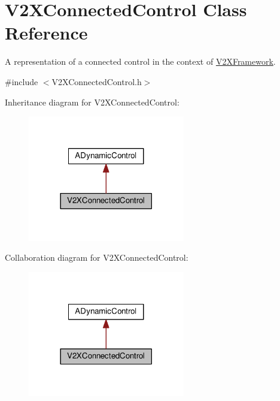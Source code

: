 \hypertarget{classV2XConnectedControl}{}\section{V2\+X\+Connected\+Control Class Reference}
\label{classV2XConnectedControl}


A representation of a connected control in the context of \hyperlink{classV2XFramework}{V2\+X\+Framework}.  




{\ttfamily \#include $<$V2\+X\+Connected\+Control.\+h$>$}



Inheritance diagram for V2\+X\+Connected\+Control\+:\nopagebreak
\begin{figure}[H]
\begin{center}
\leavevmode
\includegraphics[width=194pt]{classV2XConnectedControl__inherit__graph}
\end{center}
\end{figure}


Collaboration diagram for V2\+X\+Connected\+Control\+:\nopagebreak
\begin{figure}[H]
\begin{center}
\leavevmode
\includegraphics[width=194pt]{classV2XConnectedControl__coll__graph}
\end{center}
\end{figure}
